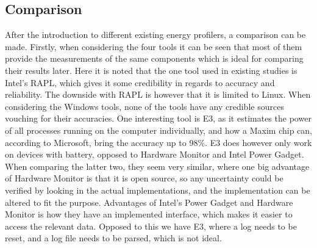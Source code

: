 \subsection{Comparison}\label{subsec:software_comparison}

After the introduction to different existing energy profilers, a comparison can be made. Firstly, when considering the four tools it can be seen that most of them provide the measurements of the  same components which is ideal for comparing their results later. Here it is noted that the one tool used in existing studies is Intel's RAPL, which gives it some credibility in regards to accuracy and reliability. The downside with RAPL is however that it is limited to Linux. When considering the Windows tools, none of the tools have any credible sources vouching for their accuracies. One interesting tool is E3, as it estimates the power of all processes running on the computer individually, and how a Maxim chip can, according to Microsoft, bring the accuracy up to 98\%.\cite[]{E3WinHec} E3 does however only work on devices with battery, opposed to Hardware Monitor and Intel Power Gadget. When comparing the latter two, they seem very similar, where one big advantage of Hardware Monitor is that it is open source, so any uncertainty could be verified by looking in the actual implementations, and the implementation can be altered to fit the purpose. Advantages of Intel's Power Gadget and Hardware Monitor is how they have an implemented interface, which makes it easier to access the relevant data. Opposed to this we have E3, where a log needs to be reset, and a log file needs to be parsed, which is not ideal.